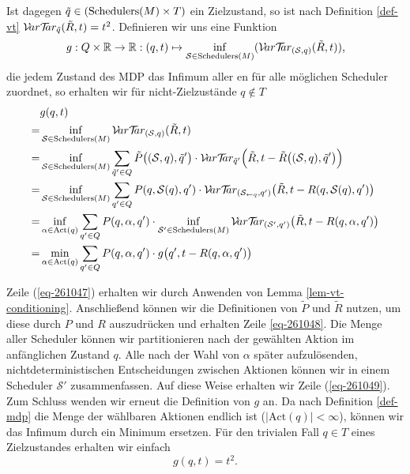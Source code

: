 \documentclass[a4paper]{article}
\theoremstyle{nonumberplain}
\begin{document}
Ist dagegen $\tilde{q} \in  (\mathrm{Schedulers}(M) \times T)$ ein Zielzustand, so ist nach Definition \ref{def-vt} $\mathcal{V}\!ar \mathcal{T}\!\!ar_{\tilde{q}}(\tilde{R},t) = t^2$.
Definieren wir uns eine Funktion
\begin{equation}
	g : Q \times \mathbb{R} \to \mathbb{R} : (q,t) \mapsto \inf_{\mathcal{S} \in \mathrm{Schedulers}(M)}(\mathcal{V}\!ar \mathcal{T}\!\!ar_{(\mathcal{S},q)}(\tilde{R},t))\text{,}
\end{equation}
die jedem Zustand des MDP \mdpex{} das Infimum aller \vt{}en für alle möglichen Scheduler zuordnet, so erhalten wir für nicht-Zielzustände $q\notin T$
\begin{align}
	&g(q,t)\\
	=& \inf_{\mathcal{S} \in \mathrm{Schedulers}(M)}\mvt_{(\mathcal{S},q)}(\tilde{R},t) \\
	=& \inf_{\mathcal{S} \in \mathrm{Schedulers}(M)}\sum_{\tilde{q}' \in Q} \tilde{P}\big((\mathcal{S},q),\tilde{q}'\big) \cdot \mvt_{\tilde{q}'}\Big(\tilde{R},t -\tilde{R}\big((\mathcal{S},q),\tilde{q}'\big)\Big) \label{eq-261047}\\
	=& \inf_{\mathcal{S} \in \mathrm{Schedulers}(M)}\sum_{q' \in Q} P(q,\mathcal{S}(q),q') \cdot \mvt_{(\mathcal{S}_{\leftarrow q},q')}\big(\tilde{R},t -R(q,\mathcal{S}(q),q')\big)\label{eq-261048}\\%
	=& \inf_{\alpha \in \mathrm{Act}(q)}\sum_{q' \in Q} P(q,\alpha,q') \cdot \inf_{\mathcal{S'} \in \mathrm{Schedulers}(M)} \mvt_{(\mathcal{S'},q')}\big(\tilde{R},t -R(q,\alpha,q')\big)\label{eq-261049}\\%
	=& \min_{\alpha \in \mathrm{Act}(q)}\sum_{q' \in Q} P(q,\alpha,q') \cdot g\big(q',t -R(q,\alpha,q')\big)\label{eq-grec}
\end{align}

Zeile (\ref{eq-261047}) erhalten wir durch Anwenden von Lemma \ref{lem-vt-conditioning}. Anschließend können wir die Definitionen von $\tilde{P}$ und $\tilde{R}$ nutzen, um diese durch $P$ und $R$ auszudrücken und erhalten Zeile \ref{eq-261048}. Die Menge aller Scheduler können wir partitionieren nach der gewählten Aktion im anfänglichen Zustand $q$. Alle nach der Wahl von $\alpha$ später aufzulösenden, nichtdeterministischen Entscheidungen zwischen Aktionen können wir in einem Scheduler $\mathcal{S'}$ zusammenfassen. Auf diese Weise erhalten wir Zeile (\ref{eq-261049}). Zum Schluss wenden wir erneut die Definition von $g$ an. Da nach Definition \ref{def-mdp} die Menge der wählbaren Aktionen endlich ist ($|\mathrm{Act}(q)| < \infty$), können wir das Infimum durch ein Minimum ersetzen.
Für den trivialen Fall $q\in T$ eines Zielzustandes erhalten wir einfach
\begin{equation}\label{eq-gt2}
	g(q,t) = t^2\text{.}
\end{equation}
\end{document}
